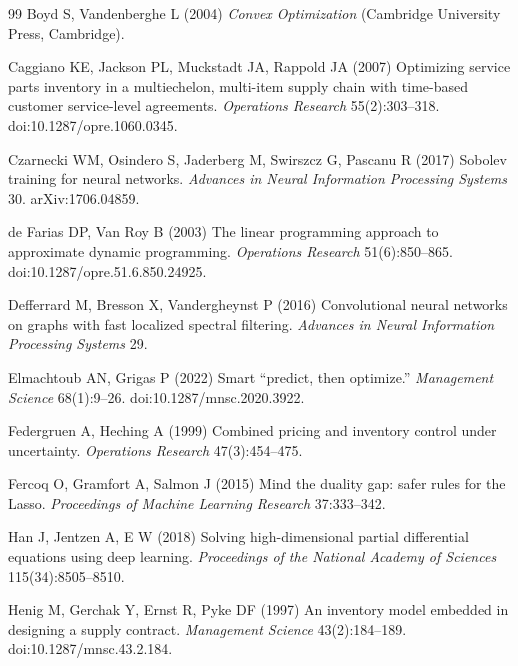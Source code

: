 \documentclass[11pt,letterpaper]{article}
\theoremstyle{definition}
\newcommand{\1}{\mathbf 1}
\begin{document}
\begin{thebibliography}{99}
Boyd S, Vandenberghe L (2004) \emph{Convex Optimization} (Cambridge University Press, Cambridge).

Caggiano KE, Jackson PL, Muckstadt JA, Rappold JA (2007) Optimizing service parts inventory in a multiechelon, multi-item supply chain with time-based customer service-level agreements. \emph{Operations Research} 55(2):303--318. doi:10.1287/opre.1060.0345.

Czarnecki WM, Osindero S, Jaderberg M, Swirszcz G, Pascanu R (2017) Sobolev training for neural networks. \emph{Advances in Neural Information Processing Systems} 30. arXiv:1706.04859.

de Farias DP, Van Roy B (2003) The linear programming approach to approximate dynamic programming. \emph{Operations Research} 51(6):850--865. doi:10.1287/opre.51.6.850.24925.

Defferrard M, Bresson X, Vandergheynst P (2016) Convolutional neural networks on graphs with fast localized spectral filtering. \emph{Advances in Neural Information Processing Systems} 29.

Elmachtoub AN, Grigas P (2022) Smart ``predict, then optimize.'' \emph{Management Science} 68(1):9--26. doi:10.1287/mnsc.2020.3922.

Federgruen A, Heching A (1999) Combined pricing and inventory control under uncertainty. \emph{Operations Research} 47(3):454--475.

Fercoq O, Gramfort A, Salmon J (2015) Mind the duality gap: safer rules for the Lasso. \emph{Proceedings of Machine Learning Research} 37:333--342.

Han J, Jentzen A, E W (2018) Solving high-dimensional partial differential equations using deep learning. \emph{Proceedings of the National Academy of Sciences} 115(34):8505--8510.

Henig M, Gerchak Y, Ernst R, Pyke DF (1997) An inventory model embedded in designing a supply contract. \emph{Management Science} 43(2):184--189. doi:10.1287/mnsc.43.2.184.


\end{thebibliography}
\end{document}
